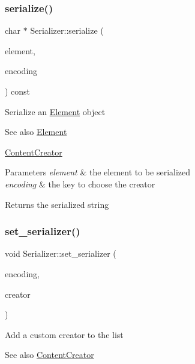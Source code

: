 \subsubsection{\texorpdfstring{serialize()}{serialize()}\hspace{0.1cm}{\footnotesize\ttfamily [2/2]}}
{\footnotesize\ttfamily char $\ast$ Serializer\+::serialize (\begin{DoxyParamCaption}\item[{\mbox{\hyperlink{classElement}{Element}} $\ast$}]{element,  }\item[{const char $\ast$}]{encoding }\end{DoxyParamCaption}) const\hspace{0.3cm}{\ttfamily [virtual]}}

Serialize an \mbox{\hyperlink{classElement}{Element}} object \begin{DoxySeeAlso}{See also}
\mbox{\hyperlink{classElement}{Element}} 

\mbox{\hyperlink{classContentCreator}{Content\+Creator}}
\end{DoxySeeAlso}

\begin{DoxyParams}{Parameters}
{\em element} & the element to be serialized \\
\hline
{\em encoding} & the key to choose the creator \\
\hline
\end{DoxyParams}
\begin{DoxyReturn}{Returns}
the serialized string 
\end{DoxyReturn}
\mbox{\label{classSerializer_a0258559787f09d3a7bfe6bb1c41cc118}} 
\subsubsection{\texorpdfstring{set\+\_\+serializer()}{set\_serializer()}}
{\footnotesize\ttfamily void Serializer\+::set\+\_\+serializer (\begin{DoxyParamCaption}\item[{const char $\ast$}]{encoding,  }\item[{\mbox{\hyperlink{classContentCreator}{Content\+Creator}} $\ast$}]{creator }\end{DoxyParamCaption})}

Add a custom creator to the list \begin{DoxySeeAlso}{See also}
\mbox{\hyperlink{classContentCreator}{Content\+Creator}}
\end{DoxySeeAlso}

